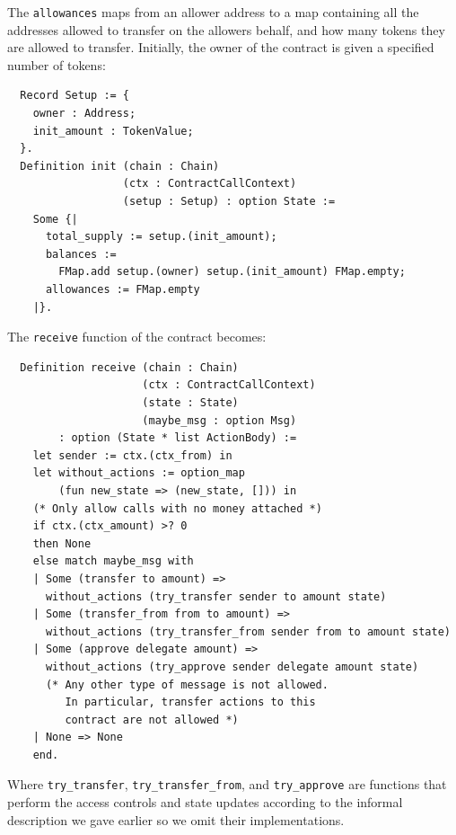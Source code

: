 \documentclass[twoside,11pt,openright]{report}
\newenvironment{code}{\captionsetup{type=figure, singlelinecheck=off, justification=raggedleft}}{}
\newcommand{\coq}[1]{\texttt{#1}}
\begin{document}
The \coq{allowances} maps from an allower address to a map containing all the addresses allowed to transfer on the allowers behalf, and how many tokens they are allowed to transfer. 
Initially, the owner of the contract is given a specified number of tokens:
\begin{code}
\label{def:EIP20-Setup}
\begin{verbatim}
  Record Setup := {
    owner : Address;
    init_amount : TokenValue;
  }.
  Definition init (chain : Chain)
	              (ctx : ContractCallContext)
	              (setup : Setup) : option State :=
    Some {| 
      total_supply := setup.(init_amount);
      balances := 
        FMap.add setup.(owner) setup.(init_amount) FMap.empty;
      allowances := FMap.empty
    |}.

\end{verbatim}
\end{code}
The \coq{receive} function of the contract becomes:
\begin{code}
\label{def:EIP20-receive}
\begin{verbatim}
  Definition receive (chain : Chain)
	                 (ctx : ContractCallContext)
	                 (state : State)
	                 (maybe_msg : option Msg)
        : option (State * list ActionBody) :=
    let sender := ctx.(ctx_from) in
    let without_actions := option_map 
        (fun new_state => (new_state, [])) in
    (* Only allow calls with no money attached *)
    if ctx.(ctx_amount) >? 0
    then None
    else match maybe_msg with
    | Some (transfer to amount) => 
      without_actions (try_transfer sender to amount state)
    | Some (transfer_from from to amount) =>
      without_actions (try_transfer_from sender from to amount state)
    | Some (approve delegate amount) => 
      without_actions (try_approve sender delegate amount state)
      (* Any other type of message is not allowed.
	     In particular, transfer actions to this 
	     contract are not allowed *)
    | None => None
    end.
\end{verbatim}
\end{code}
Where \coq{try\_transfer}, \coq{try\_transfer\_from}, and \coq{try\_approve} are functions that perform the access controls and state updates according to the informal description we gave earlier so we omit their implementations.
\end{document}
